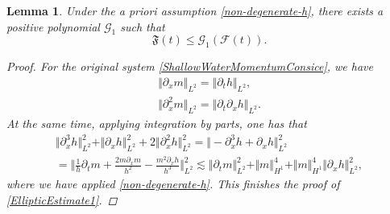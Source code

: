 \documentclass[reqno,11pt]{amsart}
\newcommand{\norm}[2]{\Vert #1 \Vert_{#2}}
\theoremstyle{plain}
\newtheorem{lemma}[theorem]{Lemma}
\theoremstyle{definition}
\numberwithin{equation}{section}
\begin{document}
\begin{lemma}
    \label{EllipticLemma} 
    Under the {\it a priori} assumption \ref{non-degenerate-h},
   there exists a positive polynomial $\mathcal{G}_1$ %
   such that
   \begin{equation}
   \label{EllipticEstimate1}
       \mathfrak F(t)\leq \mathcal{G}_1(\mathcal{F}(t)).
   \end{equation}

\begin{proof}
For the original system \eqref{ShallowWaterMomentumConsice}, we have
        \begin{gather}
        \label{EllipticHeight}
            \norm{\partial_x m}{L^2}= \norm{\partial_t h}{L^2}, \\
            \label{EllipticHeightD}
            \norm{\partial_x^2 m}{L^2}=\norm{\partial_t \partial_x h}{L^2}.
        \end{gather}
    At the same time, applying integration by parts, one has that
    \begin{equation}
            \label{EllipticMomentum}
    \begin{gathered}
            \norm{\partial_x^3 h}{L^2}^2+\norm{\partial_x h}{L^2}^2 + 2 \norm{\partial_x^2 h}{L^2}^2 = \norm{-\partial_{x}^3h + \partial_x h}{L^2}^2\\
            = \norm{\frac{1}{h}\partial_t m + \frac{2 m \partial_x m}{h^2} - \frac{m^2 \partial_x h}{h^3}}{L^2}^2 \lesssim \norm{\partial_t m}{L^2}^2+\norm{m}{H^1}^4+\norm{m}{H^1}^4 \norm{\partial_x h}{L^2}^2,
        \end{gathered}
    \end{equation}
    where we have applied \eqref{non-degenerate-h}.
This finishes the proof of \eqref{EllipticEstimate1}.

\end{proof}
\end{lemma}
\end{document}

